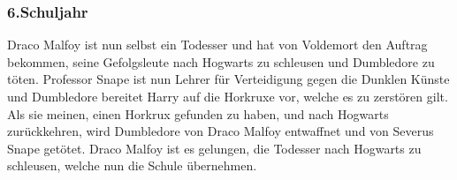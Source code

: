 \documentclass[a4paper, 10pt]{article}
\begin{document}
\subsubsection*{\large 6.Schuljahr}
Draco Malfoy ist nun selbst ein Todesser und hat von Voldemort den Auftrag bekommen, seine Gefolgsleute nach Hogwarts zu schleusen und Dumbledore zu töten.
\vspace{10pt}
\newline
Professor Snape ist nun Lehrer für Verteidigung gegen die Dunklen Künste und Dumbledore bereitet Harry auf die Horkruxe vor, welche es zu zerstören gilt. Als sie meinen, einen Horkrux gefunden zu haben, und nach Hogwarts zurückkehren, wird Dumbledore von Draco Malfoy entwaffnet und von Severus Snape getötet.
\vspace{10pt}
\newline
Draco Malfoy ist es gelungen, die Todesser nach Hogwarts zu schleusen, welche nun die Schule übernehmen.
\end{document}
